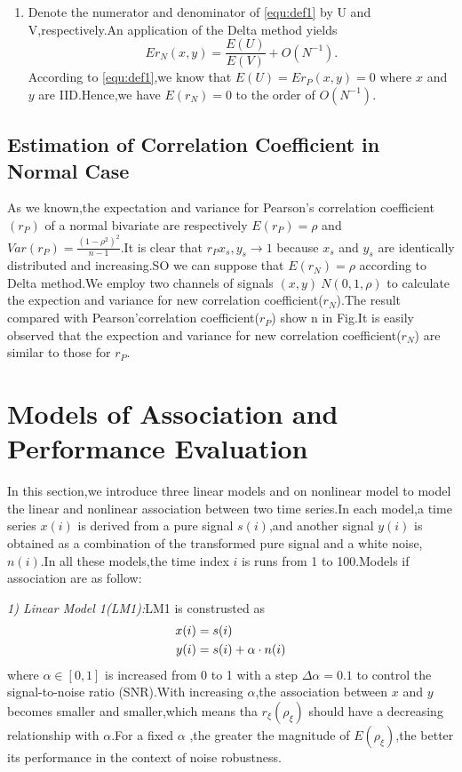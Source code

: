 \documentclass[journal]{IEEEtran}
\begin{document}
\begin{enumerate}
      \item Denote the numerator and denominator of \ref{equ:def1} by U and V,respectively.An application of the Delta method yields
          \begin{equation}\label{equ:theorom1-4}
            E{r_{N}(x,y)}=\frac{E(U)}{E(V)}+O(N^{-1}).
          \end{equation}
          According to \ref{equ:def1},we know that $E(U)=E{r_{P}(x,y)}=0$ where $x$ and $y$ are IID.Hence,we have $E(r_{N})=0$ to the order of $O(N^{-1})$.
    \end{enumerate}


  \subsection{Estimation of Correlation Coefficient in Normal Case}
    As we known,the expectation and variance for Pearson's correlation coefficient$(r_{P})$ of a normal bivariate are respectively $E(r_{P})=\rho$ and $Var(r_{P})=\frac{(1-\rho^{2})^{2}}{n-1}$.It is clear that $r_{P}{x_{s},y_{s}}\rightarrow 1$ because $x_{s}$ and $y_{s}$ are identically distributed and increasing.SO we can suppose that $E(r_{N})=\rho$ according to Delta method.We employ two channels of signals $(x,y)~N(0,1,\rho)$ to calculate the expection and variance for new correlation coefficient($r_N$).The result compared with Pearson'correlation coefficient($r_{P}$) show n in Fig.It is easily observed that the expection and variance for new correlation coefficient($r_{N}$) are similar to those for $r_{P}$.


\section{Models of Association and\\Performance Evaluation}\label{sec:models}
    In this section,we introduce three linear models and on nonlinear model to model the linear and nonlinear association between two time series.In each model,a time series $x(i)$ is derived from a pure signal $s(i)$,and another signal $y(i)$ is obtained as a combination of the transformed pure signal and a white noise,$n(i)$.In all these models,the time index $i$ is runs from 1 to 100.Models if association are as follow:

    \emph{1) Linear Model 1(LM1):}LM1 is construsted as
      \begin{align}
        x(i)&=s(i) \notag \\
        y(i)&=s(i)+\alpha \cdot n(i)
      \end{align}
      where $ \alpha \in [0,1] $ is increased from 0 to 1 with a step $ \Delta \alpha =0.1 $ to control the signal-to-noise ratio (SNR).With increasing $\alpha$,the association between $x$ and $y$ becomes smaller and smaller,which means tha $r_{\xi }(\rho _{\xi })$ should have a decreasing relationship with $\alpha$.For a fixed $\alpha$ ,the greater the magnitude of $E(\rho _{\xi })$,the better its performance in the context of noise robustness.
\end{document}
